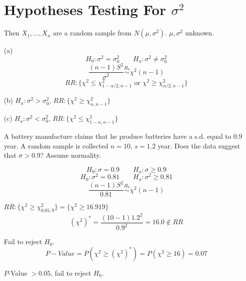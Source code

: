 \section{Hypotheses Testing For $\sigma^2$}
Then $X_1,\dots,X_n$ are a random sample from $N(\mu,\sigma^2)$. $\mu,\sigma^2$ unknown.

(a)\[H_0:\sigma^2=\sigma_0^2 \qquad H_a:\sigma^2 \neq\sigma_0^2\]
\[\frac{(n-1)S^2}{\sigma^2} \overset{H_0}{\sim} \chi^2(n-1)\]
\[RR:\{\chi^2 \leq \chi^2_{1-\alpha/2,n-1} \text{ or } \chi^2 \geq \chi^2_{\alpha/2,n-1}\}\]

(b) $H_a:\sigma^2 >\sigma_0^2$, $RR:\{\chi^2 \geq \chi^2_{\alpha,n-1}\}$

(c) $H_a:\sigma^2 <\sigma_0^2$, $RR:\{\chi^2 \leq \chi^2_{1-\alpha,n-1}\}$

\begin{exmp}
A battery manufacture claims that he produce batteries have a s.d. equal to 0.9 year. A random sample is collected $n=10$, $s=1.2$ year. Does the data suggest that $\sigma>0.9$? Assume normality.

\[H_0:\sigma=0.9 \qquad H_a:\sigma \geq 0.9\]
\[H_0:\sigma^2=0.81 \qquad H_a:\sigma^2 \geq 0.81\]
\[\frac{(n-1)S^2}{0.81} \overset{H_0}{\sim} \chi^2(n-1)\]

$RR:\{\chi^2 \geq \chi^2_{0.05,9}\}=\{\chi^2 \geq 16.919\}$
\[(\chi^2)^*=\frac{(10-1)1.2^2}{0.9^2}=16.0 \notin RR \]

Fail to reject $H_0$.
\[P-Value=P(\chi^2\geq (\chi^2)^* )=P(\chi^2\geq  16)=0.07\]

$P$-Value $>0.05$, fail to reject $H_0$.
\end{exmp}